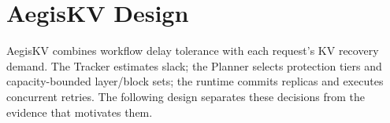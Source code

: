 \section{AegisKV Design}
\label{sec:design}

AegisKV combines workflow delay tolerance with each request's KV
recovery demand. The Tracker estimates slack; the Planner selects
protection tiers and capacity-bounded layer/block sets; the runtime
commits replicas and executes concurrent retries. The following design
separates these decisions from the evidence that motivates them.









